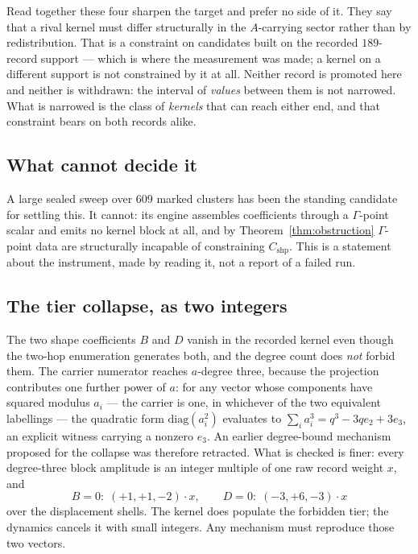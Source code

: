 \documentclass[11pt]{article}
\theoremstyle{plain}
\theoremstyle{definition}
\theoremstyle{remark}
\newcommand{\chk}[1]{}
\begin{document}
Read together these four sharpen the target and prefer no side of it. They say
that a rival kernel must differ structurally in the $A$-carrying sector rather
than by redistribution. That is a constraint on candidates built on the
recorded $189$-record support --- which is where the measurement was made; a
kernel on a different support is not constrained by it at all. Neither record is promoted here and neither is withdrawn: the interval of
\emph{values} between them is not narrowed. What is narrowed is the class of
\emph{kernels} that can reach either end, and that constraint bears on both
records alike.

\subsection{What cannot decide it}

A large sealed sweep over $609$ marked clusters has been the standing candidate
for settling this. It cannot: its engine assembles coefficients through a
$\Gamma$-point scalar and emits no kernel block at all, and by
Theorem~\ref{thm:obstruction} $\Gamma$-point data are structurally incapable of
constraining $C_{\mathrm{shp}}$. This is a statement about the instrument, made
by reading it, not a report of a failed run.
\chk{FINDING: the marked-cluster engine emits the Gamma scalar only — a completed 609-sweep cannot decide C\_shp}

\subsection{The tier collapse, as two integers}

The two shape coefficients $B$ and $D$ vanish in the recorded kernel even
though the two-hop enumeration generates both, and the degree count does
\emph{not} forbid them. The carrier numerator reaches $a$-degree three, because
the projection contributes one further power of $a$: for any vector whose
components have squared modulus $a_i$ --- the carrier is one, in whichever of
the two equivalent labellings --- the quadratic form $\mathrm{diag}(a_i^2)$
evaluates to $\sum_i a_i^3=q^3-3qe_2+3e_3$, an explicit witness carrying a
nonzero $e_3$. An earlier degree-bound mechanism proposed
for the collapse was therefore retracted. What is checked is finer: every
degree-three block amplitude is an integer multiple of one raw record weight
$x$, and
\[
  B=0:\;(+1,+1,-2)\cdot x,\qquad
  D=0:\;(-3,+6,-3)\cdot x
\]
over the displacement shells. The kernel does populate the forbidden tier; the
dynamics cancels it with small integers. Any mechanism must reproduce those two
vectors.
\chk{RETRACTED: the vertex count does NOT forbid B\_shp and D\_shp}
\chk{FINDING: the tier collapse is two integer cancellations at record level}
\chk{the vanishing coefficients are exactly the degree-3 ones}
\end{document}
